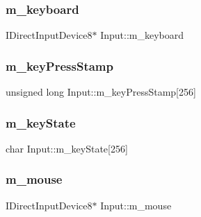 \hypertarget{class_input_a4b5ec5d30c7d36dd1c2032b400223417}{}\label{class_input_a4b5ec5d30c7d36dd1c2032b400223417} 
\subsubsection{\texorpdfstring{m\+\_\+keyboard}{m\_keyboard}}
{\footnotesize\ttfamily I\+Direct\+Input\+Device8$\ast$ Input\+::m\+\_\+keyboard\hspace{0.3cm}{\ttfamily [private]}}

\hypertarget{class_input_ae2bac0249b4c1bf1c984162e642fdf93}{}\label{class_input_ae2bac0249b4c1bf1c984162e642fdf93} 
\subsubsection{\texorpdfstring{m\+\_\+key\+Press\+Stamp}{m\_keyPressStamp}}
{\footnotesize\ttfamily unsigned long Input\+::m\+\_\+key\+Press\+Stamp\mbox{[}256\mbox{]}\hspace{0.3cm}{\ttfamily [private]}}

\hypertarget{class_input_a2fe5036aba8044c756ce7d63faa142b5}{}\label{class_input_a2fe5036aba8044c756ce7d63faa142b5} 
\subsubsection{\texorpdfstring{m\+\_\+key\+State}{m\_keyState}}
{\footnotesize\ttfamily char Input\+::m\+\_\+key\+State\mbox{[}256\mbox{]}\hspace{0.3cm}{\ttfamily [private]}}

\hypertarget{class_input_a53463bab2adf6daaed152db1276387dc}{}\label{class_input_a53463bab2adf6daaed152db1276387dc} 
\subsubsection{\texorpdfstring{m\+\_\+mouse}{m\_mouse}}
{\footnotesize\ttfamily I\+Direct\+Input\+Device8$\ast$ Input\+::m\+\_\+mouse\hspace{0.3cm}{\ttfamily [private]}}

